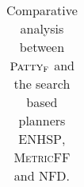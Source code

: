 \documentclass[11pt]{article}
\newcommand{\pattyf}{\ensuremath{\textsc{Patty}_\textsc{F}}\xspace}
\begin{document}
\begin{table}[tb]
{\begin{tabular}{|l||cccc||cccc||}
        \end{tabular}}
        \caption{Comparative analysis between \pattyf and the search based planners \textsc{ENHSP}, \textsc{MetricFF} and \textsc{NFD}.}
        \label{tab:exp-search}
        \end{table}
        
\end{document}
